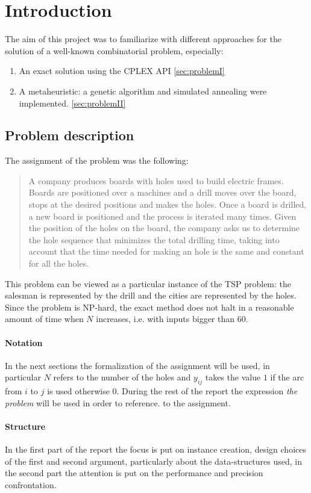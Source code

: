 
\section{Introduction}
The aim of this project was to familiarize with different approaches for the solution of a well-known combinatorial problem, especially:
\begin{enumerate}
	\item An exact solution using the CPLEX API \ref{sec:problemI}
	
	\item A metaheuristic: a genetic algorithm and simulated annealing were implemented. \ref{sec:problemII}
\end{enumerate}
\subsection{Problem description}
\label{sec:problem}
The assignment of the problem was the following:
\begin{quote}
	A company produces boards with holes used to build electric frames. Boards are positioned over a 
	machines and a drill moves over the board, stops at the desired positions
	and makes the holes. Once a board is drilled, a new board is positioned and the process is
	iterated many times. Given the position of the holes on the board, the company asks us
	to determine the hole sequence that minimizes the total drilling time, taking into account
	that the time needed for making an hole is the same and constant for all the holes.
\end{quote}
This problem can be viewed as a particular instance of the TSP problem: the salesman is represented by the 
drill and the cities are represented by the holes.
Since the problem is NP-hard, the exact method does not halt in a reasonable amount of time when $N$ increases, i.e. with inputs bigger than $60$.

\paragraph{Notation} In the next sections the formalization of the assignment will be used, in particular $N$ refers to the
number of the holes and $y_{ij}$ takes the value $1$ if the arc from $i$ to $j$
is used otherwise $0$. During the rest of the report the expression \emph{the problem} will be used in order to reference.
to the assignment.

\paragraph{Structure} In the first part of the report the focus is put on instance creation, design choices of the first and second argument, particularly about the data-structures used, in the second part the attention is put on the performance and precision confrontation.
 

